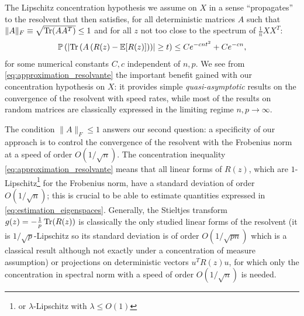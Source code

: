 \documentclass[a4papaer, titlepage]{book}
\begin{document}

The Lipschitz concentration hypothesis we assume on $X$ in a sense ``propagates'' to the resolvent that then satisfies, for all deterministic matrices $A$ such that $\|A\|_F \equiv \sqrt{\operatorname{Tr}(AA^T)} \leq 1$ and for all $z$ not too close to the spectrum of $\frac{1}{n}XX^T$:
\begin{align}\label{eq:approximation_resolvante}
  \mathbb P \left(\left\vert \operatorname{Tr} \left(A \left(R(z) - \mathbb E[R(z)]\right)\right)\right\vert\geq t\right) \leq C e^{-cnt^2} + C e^{-cn},
\end{align}
for some numerical constants $C,c$ independent of $n,p$. We see from \eqref{eq:approximation_resolvante} the important benefit gained with our concentration hypothesis on $X$: it provides simple \textit{quasi-asymptotic} results on the convergence of the resolvent with speed rates, while most of the results on random matrices are classically expressed in the limiting regime $n,p \to \infty$.

The condition $\|A\|_F \leq 1$ answers our second question: a specificity of our approach is to control the convergence of the resolvent with the Frobenius norm at a speed of order $O(1/\sqrt n)$. The concentration inequality \eqref{eq:approximation_resolvante} means that all linear forms of $R(z)$, which are $1$-Lipschitz\footnote{or $\lambda$-Lipschitz with $\lambda\leq O(1)$} for the Frobenius norm, have a standard deviation of order $O(1/\sqrt n)$; this is crucial to be able to estimate quantities expressed in \eqref{eq:estimation_eigenspaces}. 
Generally, the Stieltjes transform $g(z) = -\frac{1}{p}\operatorname{Tr}(R(z)) $ is classically the only studied linear forms of the resolvent (it is $1/\sqrt p$-Lipschitz so its standard deviation is of order $O(1/\sqrt {pn})$ which is a classical result although not exactly under a concentration of measure assumption) or projections on deterministic vectors $u^T R(z)u$, for which only the concentration in spectral norm with a speed of order $O(1/\sqrt n)$ is needed.
\end{document}
